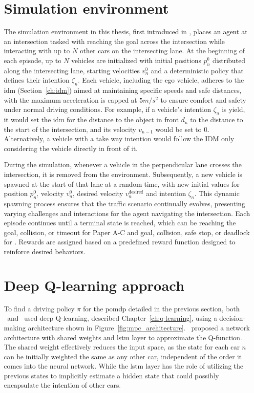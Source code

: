 \section{Simulation environment}
\label{ch:simulation_env}
The simulation environment in this thesis, first introduced in \paperLSTM, places an agent at an intersection tasked with reaching the goal across the intersection while interacting with up to $N$ other cars on the intersecting lane. At the beginning of each episode, up to $N$ vehicles are initialized with initial positions $p_n^0$ distributed along the intersecting lane, starting velocities $v_n^0$ and a deterministic policy that defines their intention $\zeta_n$. 
Each vehicle, including the ego vehicle, adheres to the \gls{idm} (Section~\ref{ch:idm}) aimed at maintaining specific speeds and safe distances, with the maximum acceleration is capped at $5 m/s^2$ to ensure comfort and safety under normal driving conditions.
For example, if a vehicle's intention $\zeta_n$ is yield, it would set the \gls{idm} for the distance to the object in front  $d_n$ to the distance to the start of the intersection, and its velocity $v_{n-1}$ would be set to $0$. Alternatively, a vehicle with a take way intention would follow the IDM only considering the vehicle directly in front of it.

During the simulation, whenever a vehicle in the perpendicular lane crosses the intersection, it is removed from the environment. Subsequently, a new vehicle is spawned at the start of that lane at a random time, with new initial values for position $p_n^0$, velocity $v_n^0$, desired velocity $v^\mathrm{desired}_n$ and intention $\zeta_n$. 
This dynamic spawning process ensures that the traffic scenario continually evolves, presenting varying challenges and interactions for the agent navigating the intersection.
Each episode continues until a terminal state is reached, which can be reaching the goal, collision, or timeout for Paper A-C and goal, collision, safe stop, or deadlock for \paperBelief. Rewards are assigned based on a predefined reward function designed to reinforce desired behaviors. 


\section{Deep Q-learning approach}
To find a driving policy $\pi$ for the \gls{pomdp} detailed in the previous section, both \paperLSTM \ and \paperMPC \ used deep Q-learning, described Chapter~\ref{ch:q-learning}, using a decision-making architecture shown in Figure~\ref{fig:mpc_architecture}. \paperLSTM \ proposed a network architecture with shared weights and \gls{lstm} layer to approximate the Q-function. The shared weight effectively reduces the input space, as the state for each car $n$ can be initially weighted the same as any other car, independent of the order it comes into the neural network. While the \gls{lstm} layer has the role of utilizing the previous states to implicitly estimate a hidden state that could possibly encapsulate the intention of other cars.

